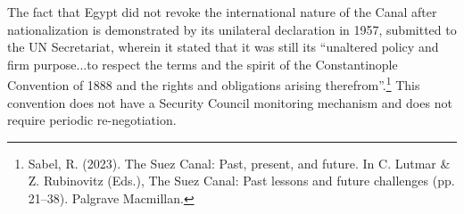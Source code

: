 The fact that Egypt did not revoke the international nature of the Canal after nationalization is demonstrated by its unilateral declaration in 1957, submitted to the UN Secretariat, wherein it stated that it was still its “unaltered policy and firm purpose...to respect the terms and the spirit of the Constantinople Convention of 1888 and the rights and obligations arising therefrom”.\footnote{Sabel, R. (2023). The Suez Canal: Past, present, and future. In C. Lutmar \& Z. Rubinovitz (Eds.), The Suez Canal: Past lessons and future challenges (pp. 21–38). Palgrave Macmillan.} This convention does not have a Security Council monitoring mechanism and does not require periodic re-negotiation.

